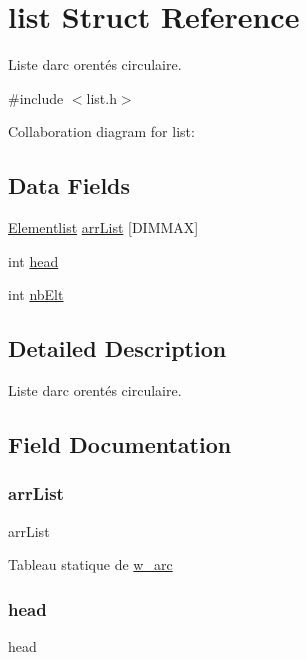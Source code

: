 \hypertarget{structlist}{}\section{list Struct Reference}
\label{structlist}


Liste d\textquotesingle{}arc orentés circulaire.  




{\ttfamily \#include $<$list.\+h$>$}



Collaboration diagram for list\+:
\subsection*{Data Fields}
\begin{DoxyCompactItemize}
\item 
\hyperlink{structw__arc}{Elementlist} \hyperlink{structlist_a8ee1aed8050a21d001aa0befae4ea554}{arr\+List} \mbox{[}D\+I\+M\+M\+AX\mbox{]}
\item 
int \hyperlink{structlist_a434acd167ada209c34621739b6b8c583}{head}
\item 
int \hyperlink{structlist_a600e1520c855931c7b4a1ee93780b1b9}{nb\+Elt}
\end{DoxyCompactItemize}


\subsection{Detailed Description}
Liste d\textquotesingle{}arc orentés circulaire. 

\subsection{Field Documentation}
\mbox{\label{structlist_a8ee1aed8050a21d001aa0befae4ea554}} 
\subsubsection{\texorpdfstring{arr\+List}{arrList}}
{\footnotesize\ttfamily arr\+List}

Tableau statique de \hyperlink{structw__arc}{w\+\_\+arc} \mbox{\label{structlist_a434acd167ada209c34621739b6b8c583}} 
\subsubsection{\texorpdfstring{head}{head}}
{\footnotesize\ttfamily head}

